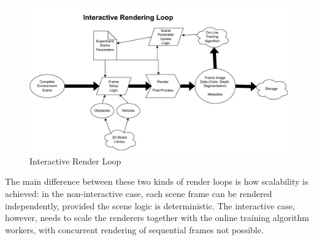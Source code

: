 \begin{figure}[h]
    \centering
    \includegraphics[width=14.5cm]{src/img/fig/fig-5 interactive render loop.drawio.pdf}
    \caption{Interactive Render Loop}
    \label{fig:design-render-interactive}
\end{figure}

The main difference between these two kinds of render loops is how scalability is achieved: in the non-interactive case, each scene frame can be rendered independently, provided the scene logic is deterministic. The interactive case, however, needs to scale the renderers together with the online training algorithm workers, with concurrent rendering of sequential frames not possible.